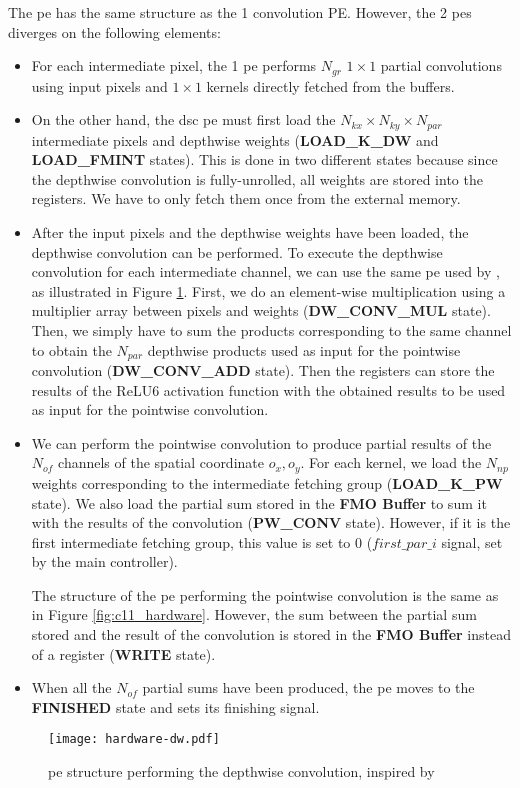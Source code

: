 The \acrshort{pe} has the same structure as the 1 convolution PE. However, the 2 \acrshort{pe}s diverges on the following elements:
\begin{itemize}
    \item For each intermediate pixel, the 1 \acrshort{pe} performs $N_{gr}$ $1 \times 1$ partial convolutions using input pixels and $1 \times 1$ kernels directly fetched from the buffers.
    \item On the other hand, the \acrshort{dsc} \acrshort{pe} must first load the $N_{kx} \times N_{ky} \times N_{par}$ intermediate pixels and depthwise weights (\textbf{LOAD\_K\_DW} and \textbf{LOAD\_FMINT} states). This is done in two different states because since the depthwise convolution is fully-unrolled, all weights are stored into the registers. We have to only fetch them once from the external memory.
    \item After the input pixels and the depthwise weights have been loaded, the depthwise convolution can be performed. To execute the depthwise convolution for each intermediate channel, we can use the same \acrshort{pe} used by \textcite{bai_cnn_2018}, as illustrated in Figure \ref{fig:dsc_hardware}. First, we do an element-wise multiplication using a multiplier array between pixels and weights (\textbf{DW\_CONV\_MUL} state). Then, we simply have to sum the products corresponding to the same channel to obtain the $N_{par}$ depthwise products used as input for the pointwise convolution (\textbf{DW\_CONV\_ADD} state). Then the registers can store the results of the ReLU6 activation function with the obtained results to be used as input for the pointwise convolution.
    \item We can perform the pointwise convolution to produce partial results of the $N_{of}$ channels of the spatial coordinate $o_x, o_y$. For each kernel, we load the $N_{np}$ weights corresponding to the intermediate fetching group (\textbf{LOAD\_K\_PW} state). We also load the partial sum stored in the \textbf{FMO Buffer} to sum it with the results of the convolution (\textbf{PW\_CONV} state). However, if it is the first intermediate fetching group, this value is set to 0 ($first\_par\_i$ signal, set by the main controller).
    
    The structure of the \acrshort{pe} performing the pointwise convolution is the same as in Figure \ref{fig:c11_hardware}. However, the sum between the partial sum stored and the result of the convolution is stored in the \textbf{FMO Buffer} instead of a register (\textbf{WRITE} state).
    \item When all the $N_{of}$ partial sums have been produced, the \acrshort{pe} moves to the \textbf{FINISHED} state and sets its finishing signal.
\end{itemize}
%
\begin{figure}[H]
    \centering
    \texttt{[image: hardware-dw.pdf]}
    \caption{\acrshort{pe} structure performing the depthwise convolution, inspired by \cite{bai_cnn_2018}}
    \label{fig:dsc_hardware}
\end{figure}


